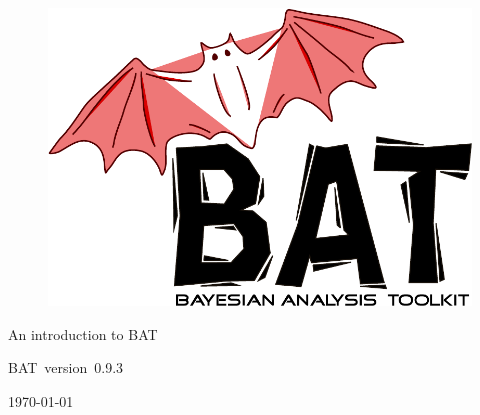 \documentclass[11pt, a4paper]{article}
\newcommand{\bat}{{\sc BAT}}
\newcommand{\versionno}{0.9.3}
\newcommand{\version}{version~\versionno}
\begin{document}

\thispagestyle{empty}

\begin{figure}
\includegraphics[scale=0.25]{bat}
\end{figure}

\vspace*{1cm}

\begin{center}


{\Large An introduction to \bat}
\\

\vspace{1cm}

{\large \bat\ \version}

\end{center}

\thispagestyle{empty}

\vfill

\begin{center}
\today
\end{center}

\pagebreak


\thispagestyle{empty}

\enlargethispage{2cm}

\tableofcontents

\pagebreak

\end{document}

